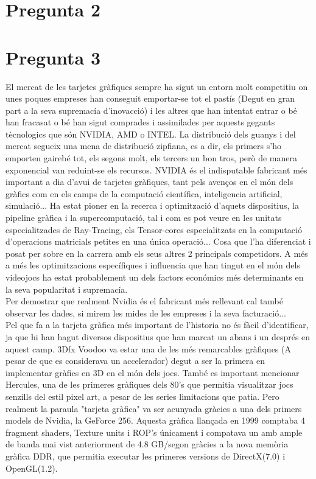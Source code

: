 \documentclass[12pt]{article}
\begin{document}
\section{Pregunta 2}

\section{Pregunta 3}
El mercat de les tarjetes gràfiques sempre ha sigut un entorn molt competitiu on unes poques empreses han conseguit emportar-se tot el pastís (Degut en gran part a la seva supremacía d'inovacció) i les altres que han intentat entrar
 o bé han fracasat o bé han sigut comprades i assimilades per aquests gegants tècnologics que són NVIDIA, AMD o INTEL. La distribució dels guanys i del mercat segueix una mena de distribució zipfiana, es a dir, els primers s'ho emporten 
gairebé tot, els segons molt, els tercers un bon tros, però de manera exponencial van reduint-se els recursos. NVIDIA és el indisputable fabricant més important a dia d'avui de tarjetes gràfiques, tant pels avenços en el món dels gràfics 
com en els camps de la computació científica, inteligencia artificial, simulació... Ha estat pioner en la recerca i optimització d'aquets dispositius, la pipeline gràfica i la supercomputació, tal i com es pot veure en les 
unitats especialitzades de Ray-Tracing, els Tensor-cores especialitzats en la computació d'operacions matricials petites en una única operació... Cosa que l'ha diferenciat i posat per sobre en la carrera amb els seus altres 2 
principals competidors. A més a més les optimitzacions específiques i influencia que han tingut en el món dels videojocs ha estat probablement un dels factors económics més determinants en la seva popularitat i supremacía. 
\\

Per demostrar que realment Nvidia és el fabricant més rellevant cal també observar les dades, si mirem les mides de les empreses i la seva facturació... 
\\ 

Pel que fa a la tarjeta gràfica més important de l'historia no és fàcil d'identificar, ja que hi han hagut diversos dispositius que han marcat un abans i un després en aquest camp. 3Dfx Voodoo va estar una de les més remarcables gràfiques
(A pesar de que es considerava un accelerador) degut a ser la primera en implementar gràfics en 3D en el món dels jocs. També es important mencionar Hercules, una de les primeres gràfiques dels 80's que permitia visualitzar jocs senzills del estil pixel art,
a pesar de les series limitacions que patia. Pero realment la paraula "tarjeta gràfica" va ser acunyada gràcies a una dels primers models de Nvidia, la GeForce 256. Aquesta gràfica llançada en 1999 comptaba 4 fragment shaders, Texture units i ROP's únicament i 
compatava un amb ample de banda mai vist anteriorment de 4.8 GB/segon gràcies a la nova memòria gràfica DDR, que permitia executar les primeres versions de DirectX(7.0) i OpenGL(1.2).
\\
\end{document}
